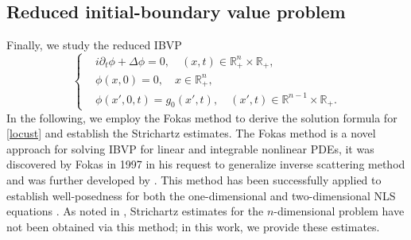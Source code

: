 \documentclass[preprint,compress,12pt]{elsarticle}
\numberwithin{equation}{section}
\begin{document}
\subsection{Reduced initial-boundary value problem}\label{sec23}
Finally, we study the reduced IBVP
\begin{equation}\label{locust}
	\left\{\begin{aligned}
		&	i\partial_{t}\phi+\Delta \phi=0, \quad (x, t) \in \mathbb{R}_{+}^{n} \times \mathbb{R}_{+}, \\
		&\phi(x,0)=0, \quad x\in\mathbb{R}^{n}_{+},\\& \phi(x',0,t)=g_{0}(x',t), \quad  (x',t)\in \mathbb{R}^{n-1}\times \mathbb{R}_{+}.
	\end{aligned}
	\right.
\end{equation}
In the following, we  employ the Fokas method to derive the solution formula for \eqref{locust} and establish the Strichartz estimates. The Fokas method is a novel approach for solving IBVP  for linear and integrable nonlinear PDEs, it was discovered by Fokas in 1997 \cite{Fokas} in his request to generalize inverse scattering method and was further developed by \cite{Fokas1, Fok}. This method has been successfully applied to establish well-posedness for both the one-dimensional  and  two-dimensional NLS equations \cite{dew,Himonas}.  As noted in \cite{facilitate}, Strichartz estimates for the $n$-dimensional problem have not been obtained via this method; in this work, we  provide these estimates.
\end{document}
